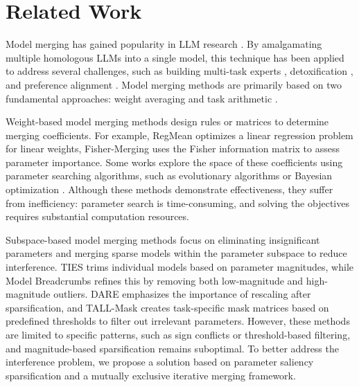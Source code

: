 \section{Related Work}
Model merging has gained popularity in LLM research \cite{metagpt, yang2024model}. By amalgamating multiple homologous LLMs into a single model, this technique has been applied to address several challenges, such as building multi-task experts \cite{cai2023robust, fusechat}, detoxification \cite{hu2024separate, zhang2023composing}, and preference alignment \cite{dogerm, rame2024rewarded}. Model merging methods are primarily based on two fundamental approaches: weight averaging \cite{modelsoups} and task arithmetic \cite{ta}. 

Weight-based model merging methods design rules or matrices to determine merging coefficients. For example, RegMean \cite{jin2022dataless} optimizes a linear regression problem for linear weights, Fisher-Merging \cite{matena2022merging} uses the Fisher information matrix to assess parameter importance. Some works explore the space of these coefficients using parameter searching algorithms, such as evolutionary algorithms \cite{evolutionary} or Bayesian optimization \cite{liu2024checkpoint}. Although these methods demonstrate effectiveness, they suffer from inefficiency: parameter search is time-consuming, and solving the objectives requires substantial computation resources. 

Subspace-based model merging methods focus on eliminating insignificant parameters and merging sparse models within the parameter subspace to reduce interference. TIES \cite{ties} trims individual models based on parameter magnitudes, while Model Breadcrumbs \cite{model-breadcrumbs} refines this by removing both low-magnitude and high-magnitude outliers. DARE \cite{dare} emphasizes the importance of rescaling after sparsification, and TALL-Mask \cite{tallmask} creates task-specific mask matrices based on predefined thresholds to filter out irrelevant parameters. However, these methods are limited to specific patterns, such as sign conflicts or threshold-based filtering, and magnitude-based sparsification remains suboptimal. To better address the interference problem, we propose a solution based on parameter saliency sparsification and a mutually exclusive iterative merging framework.